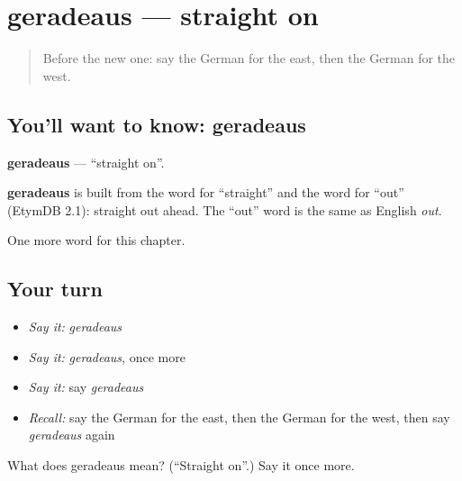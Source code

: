 \section[geradeaus]{geradeaus — straight on}

\label{lesson:GE-C108-geradeaus}



\begin{quote}
Before the new one: say the German for the east, then the German for the west.
\end{quote}

\subsection*{You'll want to know: geradeaus}
\textbf{geradeaus} — \textquotedblleft{}straight on\textquotedblright{}.

\begin{cousinweb}
\textbf{geradeaus} is built from the word for \textquotedblleft{}straight\textquotedblright{} and the word for \textquotedblleft{}out\textquotedblright{} (EtymDB 2.1): straight out ahead. The \textquotedblleft{}out\textquotedblright{} word is the same as English \emph{out}.
\end{cousinweb}

\begin{grammarlens}[title={What you've built}]
One more word for this chapter.
\end{grammarlens}

\subsection*{Your turn}
\begin{itemize}
\raggedright
  \item \emph{Say it:} \emph{geradeaus}
  \item \emph{Say it:} \emph{geradeaus}, once more
  \item \emph{Say it:} say \emph{geradeaus}
  \item \emph{Recall:} say the German for the east, then the German for the west, then say \emph{geradeaus} again
\end{itemize}

\begin{tcolorbox}[breakable,colback=teal!4,colframe=teal!35!black,title={Before you move on}]
What does geradeaus mean? (\textquotedblleft{}Straight on\textquotedblright{}.) Say it once more.
\end{tcolorbox}
